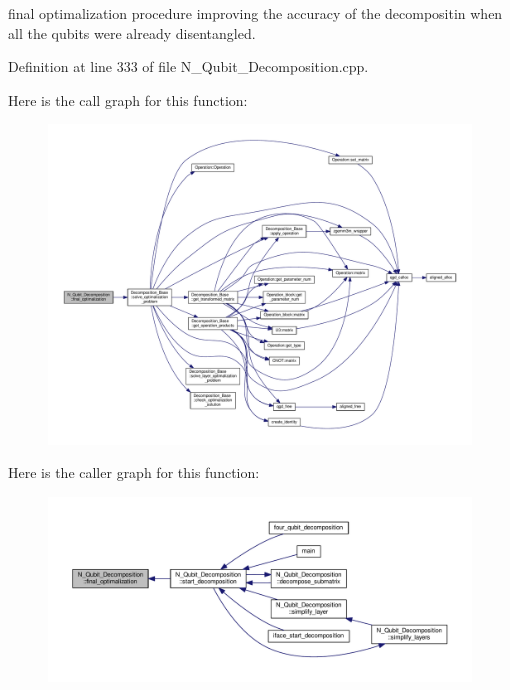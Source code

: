 final optimalization procedure improving the accuracy of the decompositin when all the qubits were already disentangled. 



Definition at line 333 of file N\+\_\+\+Qubit\+\_\+\+Decomposition.\+cpp.



Here is the call graph for this function\+:
\nopagebreak
\begin{figure}[H]
\begin{center}
\leavevmode
\includegraphics[width=350pt]{class_n___qubit___decomposition_a3a94b94920838968d4798096e969cd78_cgraph}
\end{center}
\end{figure}




Here is the caller graph for this function\+:
\nopagebreak
\begin{figure}[H]
\begin{center}
\leavevmode
\includegraphics[width=350pt]{class_n___qubit___decomposition_a3a94b94920838968d4798096e969cd78_icgraph}
\end{center}
\end{figure}


